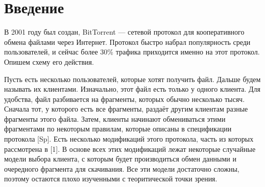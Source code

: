 \documentclass{matmex-diploma-custom}
\theoremstyle{named}
\begin{document}
\maketitle
	
\renewcommand{\contentsname}{Оглавление}
\tableofcontents
\newpage

\section*{Введение}
В 2001 году был создан, BitTorrent --- сетевой протокол для кооперативного обмена файлами через Интернет.
Протокол быстро набрал популярность среди пользователей, и сейчас более 30\% трафика приходится именно на этот протокол.
Опишем схему его действия.

Пусть есть несколько пользователей, которые хотят получить файл. Дальше будем называть их клиентами.
Изначально, этот файл есть только у одного клиента. 
Для удобства, файл разбивается на фрагменты, которых обычно несколько тысяч.
Сначала тот, у которого есть все фрагменты, раздаёт другим клиентам разные фрагменты этого файла.
Затем, клиенты начинают обмениваться этими фрагментами по некоторым правилам, 
которые описаны в спецификации протокола [Sp].
Есть несколько модификаций этого протокола, часть из которых рассмотрена в [1].
В основе всех этих модификаций лежат некоторые случайные модели выбора клиента, с которым будет производиться обмен данными 
и очередного фрагмента для скачивания. Все эти модели достаточно сложны, поэтому остаются плохо изученными с теоритической точки зрения.
\end{document}
